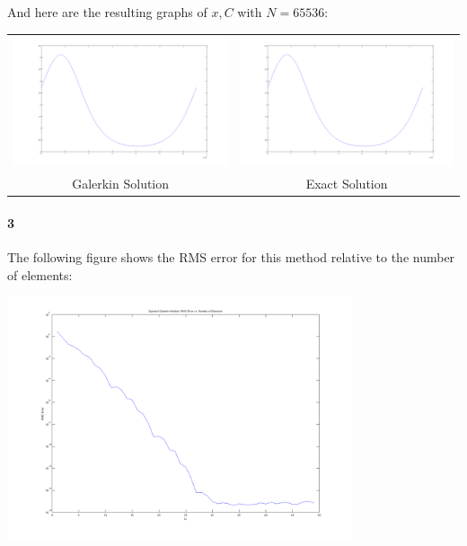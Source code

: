 \documentclass{article}
\begin{document}
And here are the resulting graphs of $x, C$ with $N = 65536$:

\begin{tabular}{cc}
\includegraphics[width=3in]{hw1_part1_fig1.png} & \includegraphics[width=3in]{hw1_part1_fig2.png} \\
Galerkin Solution & Exact Solution \\
\end{tabular}

\paragraph{3}

The following figure shows the RMS error for this method relative to the number of elements:

\begin{center}
\includegraphics[width=4in]{hw1_part1_fig3.png}
\end{center}
\end{document}
